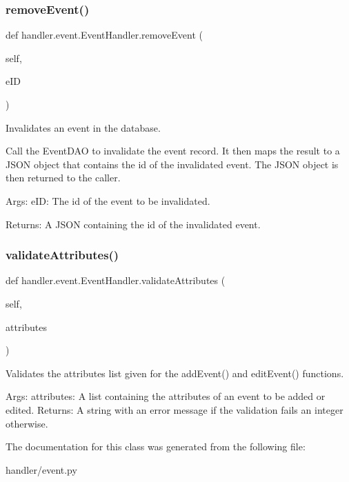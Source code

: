 \subsubsection{\texorpdfstring{remove\+Event()}{removeEvent()}}
{\footnotesize\ttfamily def handler.\+event.\+Event\+Handler.\+remove\+Event (\begin{DoxyParamCaption}\item[{}]{self,  }\item[{}]{e\+ID }\end{DoxyParamCaption})}

\begin{DoxyVerb}Invalidates an event in the database. 

Call the EventDAO to invalidate the event record. It then
maps the result to a JSON object that contains the id of the 
invalidated event. The JSON object is then returned to the caller.

Args:
    eID: The id of the event to be invalidated.

Returns:
    A JSON containing the id of the invalidated event.
\end{DoxyVerb}
 \mbox{\label{classhandler_1_1event_1_1_event_handler_a75df7c2caab81a386ec89c6958070d35}} 
\subsubsection{\texorpdfstring{validate\+Attributes()}{validateAttributes()}}
{\footnotesize\ttfamily def handler.\+event.\+Event\+Handler.\+validate\+Attributes (\begin{DoxyParamCaption}\item[{}]{self,  }\item[{}]{attributes }\end{DoxyParamCaption})}

\begin{DoxyVerb}Validates the attributes list given for the addEvent() and editEvent()
functions.

Args:
    attributes: A list containing the attributes of an event to be added or 
        edited.
Returns:
    A string with an error message if the validation fails an integer otherwise.        
\end{DoxyVerb}
 

The documentation for this class was generated from the following file\+:\begin{DoxyCompactItemize}
\item 
handler/event.\+py\end{DoxyCompactItemize}
